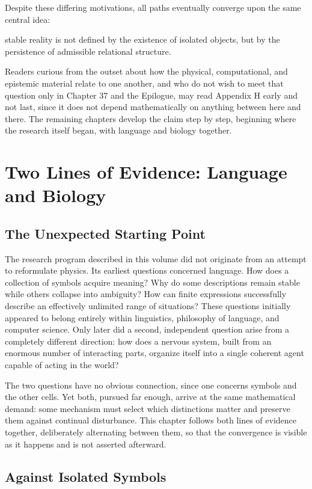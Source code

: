 \documentclass[11pt,oneside]{book}
\numberwithin{equation}{chapter}
\theoremstyle{definition}
\theoremstyle{plain}
\begin{document}
Despite these differing motivations, all paths eventually converge upon the
same central idea:

stable reality is not defined by the existence of isolated objects, but by the persistence of admissible relational structure.

Readers curious from the outset about how the physical, computational, and epistemic material relate to one another, and who do not wish to meet that question only in Chapter 37 and the Epilogue, may read Appendix H early and not last, since it does not depend mathematically on anything between here and there. The remaining chapters develop the claim step by step, beginning where the research itself began, with language and biology together.

\chapter{Two Lines of Evidence: Language and Biology}

\section{The Unexpected Starting Point}

The research program described in this volume did not originate from an attempt to reformulate physics. Its earliest questions concerned language. How does a collection of symbols acquire meaning? Why do some descriptions remain stable while others collapse into ambiguity? How can finite expressions successfully describe an effectively unlimited range of situations? These questions initially appeared to belong entirely within linguistics, philosophy of language, and computer science. Only later did a second, independent question arise from a completely different direction: how does a nervous system, built from an enormous number of interacting parts, organize itself into a single coherent agent capable of acting in the world?

The two questions have no obvious connection, since one concerns symbols and the other cells. Yet both, pursued far enough, arrive at the same mathematical demand: some mechanism must select which distinctions matter and preserve them against continual disturbance. This chapter follows both lines of evidence together, deliberately alternating between them, so that the convergence is visible as it happens and is not asserted afterward.

\section{Against Isolated Symbols}
\end{document}

